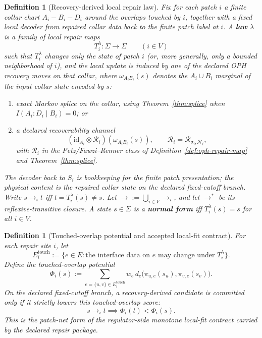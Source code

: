 \documentclass[11pt]{article}
\newtheorem{definition}[theorem]{Definition}
\theoremstyle{remark}
\theoremstyle{plain}
\begin{document}
\begin{definition}[Recovery-derived local repair law]\label{def:repair}
Fix for each patch \(i\) a finite collar chart \(A_i\!-\!B_i\!-\!D_i\) around the overlaps touched
by \(i\), together with a fixed local decoder from repaired collar data back to the finite patch
label at \(i\). A \textbf{law} \(\lambda\) is a family of local repair maps
\[
T_i^\lambda:\Sigma\to\Sigma
\qquad (i\in V)
\]
such that \(T_i^\lambda\) changes only the state of patch \(i\) (or, more generally, only a
bounded neighborhood of \(i\)), and the local update is induced by one of the declared OPH
recovery moves on that collar, where \(\omega_{A_iB_i}(s)\) denotes the \(A_i\cup B_i\) marginal
of the input collar state encoded by \(s\):
\begin{enumerate}[label=(\roman*),leftmargin=2em]
\item exact Markov splice on the collar, using Theorem~\ref{thm:splice} when
      \(I(A_i:D_i\mid B_i)=0\); or
\item a declared recoverability channel
\[
(\mathrm{id}_{A_i}\otimes \mathcal R_i)(\omega_{A_iB_i}(s)),
\qquad
\mathcal R_i=\mathcal R_{\sigma_i,\mathcal N_i},
\]
      with \(\mathcal R_i\) in the Petz/Fawzi--Renner class of
      Definition~\ref{def:oph-repair-map} and Theorem~\ref{thm:splice}.
\end{enumerate}
The decoder back to \(S_i\) is bookkeeping for the finite patch presentation; the physical content
is the repaired collar state on the declared fixed-cutoff branch. Write \(s\to_i t\) iff
\(t=T_i^\lambda(s)\neq s\). Let \(\to := \bigcup_{i\in V}\to_i\), and let \(\to^*\) be its
reflexive-transitive closure. A state \(s\in\Sigma\) is a \textbf{normal form} iff
\(T_i^\lambda(s)=s\) for all \(i\in V\).
\end{definition}

\begin{definition}[Touched-overlap potential and accepted local-fit contract]\label{def:localfit}
For each repair site \(i\), let
\[
E_i^{\mathrm{touch}}
:=
\bigl\{
e\in E:\text{the interface data on }e\text{ may change under }T_i^\lambda
\bigr\}.
\]
Define the touched-overlap potential
\[
\Phi_i(s)
:=
\sum_{e=\{u,v\}\in E_i^{\mathrm{touch}}}
w_e\, d_e\!\bigl(\pi_{u,e}(s_u),\pi_{v,e}(s_v)\bigr).
\]
On the declared fixed-cutoff branch, a recovery-derived candidate is committed only if it
strictly lowers this touched-overlap score:
\[
s\to_i t \implies \Phi_i(t)<\Phi_i(s).
\]
This is the patch-net form of the regulator-side monotone local-fit contract carried by the
declared repair package.
\end{definition}
\end{document}
